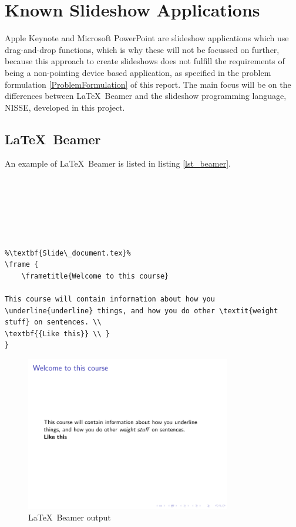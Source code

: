 \chapter{Known Slideshow Applications}
Apple Keynote and Microsoft PowerPoint are slideshow applications which use drag-and-drop functions, which is why these will not be focussed on further, because this approach to create slideshows does not fulfill the requirements of being a non-pointing device based application, as specified in the problem formulation \ref{ProblemFormulation} of this report. The main focus will be on the differences between \LaTeX~Beamer and the slideshow programming language, NISSE, developed in this project.

\section{\LaTeX~Beamer}
An example of \LaTeX~Beamer is listed in listing \ref{lst_beamer}.

\begin{lstlisting}[frame=single, caption={Beamer example}, label=lst_beamer]
%\textbf{Main\_document.tex}%






%\textbf{Slide\_document.tex}%
\frame {
	\frametitle{Welcome to this course}

This course will contain information about how you \underline{underline} things, and how you do other \textit{weight stuff} on sentences. \\
\textbf{{Like this}} \\	}
}
\end{lstlisting}

\begin{figure}[H]
	\centering
		\includegraphics[width=0.8\textwidth]{text/beamer_example.pdf}
	\caption{\LaTeX~Beamer output}
	\label{fig:beamer_example}
\end{figure}

